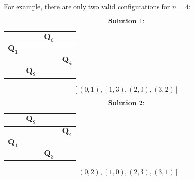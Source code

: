 \documentclass{article}
\begin{document}
For example, there are only two valid configurations for \(n = 4\):
\begin{center}
    \begin{minipage}{0.45\textwidth}
        \centering
        \[
            \textbf{Solution 1:}
        \]
        \renewcommand{\arraystretch}{2}
        \begin{tabular}{|c|c|c|c|}
            \hline
                                      &                           & $\mathbf{Q}_{\mathbf{3}}$ &                           \\
            \hline
            $\mathbf{Q}_{\mathbf{1}}$ &                           &                           &                           \\
            \hline
                                      &                           &                           & $\mathbf{Q}_{\mathbf{4}}$ \\
            \hline
                                      & $\mathbf{Q}_{\mathbf{2}}$ &                           &                           \\
            \hline
        \end{tabular}
        \renewcommand{\arraystretch}{1} %

        \[
            [(0, 1), (1, 3), (2, 0), (3, 2)]
        \]
    \end{minipage}
    \hspace{0.05\textwidth}
    \begin{minipage}{0.45\textwidth}
        \centering
        \[
            \textbf{Solution 2:}
        \]
        \renewcommand{\arraystretch}{2}
        \begin{tabular}{|c|c|c|c|}
            \hline
                                      & $\mathbf{Q}_{\mathbf{2}}$ &                           &                           \\
            \hline
                                      &                           &                           & $\mathbf{Q}_{\mathbf{4}}$ \\
            \hline
            $\mathbf{Q}_{\mathbf{1}}$ &                           &                           &                           \\
            \hline
                                      &                           & $\mathbf{Q}_{\mathbf{3}}$ &                           \\
            \hline
        \end{tabular}
        \renewcommand{\arraystretch}{1} %

        \[
            [(0, 2), (1, 0), (2, 3), (3, 1)]
        \]
    \end{minipage}
\end{center}
\end{document}
